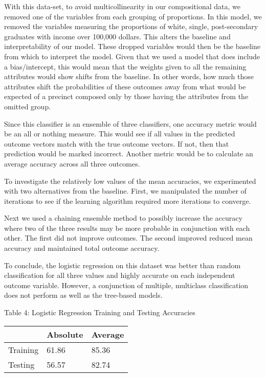 \documentclass{article}
\begin{document}
\begin{itemize}
With this data-set, to avoid multicollinearity in our compositional data, we removed one of the variables from each grouping of proportions. In this model, we removed the variables measuring the proportions of white, single, post-secondary graduates with income over 100,000 dollars. This alters the baseline and interpretability of our model. These dropped variables would then be the baseline from which to interpret the model. Given that we used a model that does include a bias/intercept, this would mean that the weights given to all the remaining attributes would show shifts from the baseline. In other words, how much those attributes shift the probabilities of these outcomes away from what would be expected of a precinct composed only by those having the attributes from the omitted group.

Since this classifier is an ensemble of three classifiers, one accuracy metric would be an all or nothing measure. This would see if all values in the predicted outcome vectors match with the true outcome vectors. If not, then that prediction would be marked incorrect. Another metric would be to calculate an average accuracy across all three outcomes.

To investigate the relatively low values of the mean accuracies, 
we experimented with two alternatives from the baseline. 
First, we manipulated the number of iterations to see if the learning algorithm required more iterations to converge.


Next we used a chaining ensemble method to possibly increase the accuracy where two of the three results may be more probable in conjunction with each other. The first did not improve outcomes. The second improved reduced mean accuracy and maintained total outcome accuracy.


To conclude, the logistic regression on this dataset was better than random classification for all three values and highly accurate on each independent outcome variable. However, a conjunction of multiple, multiclass classification does not perform as well as the tree-based models.

Table 4: Logistic Regression Training and Testing Accuracies
\begin{table}[h]
\begin{tabular}{l|ll}
\hline 
        & Absolute & Average \\
\hline
Training & 61.86    & 85.36   \\
Testing  & 56.57    & 82.74  
\end{tabular}
\end{table}


\end{itemize}
\end{document}
